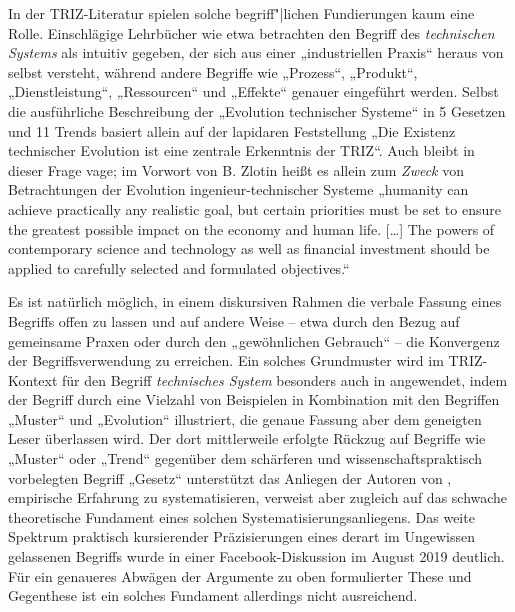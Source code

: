 \documentclass[11pt,a4paper]{article}
\begin{document}
In der TRIZ-Literatur spielen solche begriff"|lichen Fundierungen kaum eine
Rolle.  Einschlägige Lehrbücher wie etwa \cite{KS2017} betrachten den Begriff
des \emph{technischen Systems} als intuitiv gegeben, der sich aus einer
„industriellen Praxis“ heraus \cite[S. 2]{KS2017} von selbst versteht, während
andere Begriffe wie „Prozess“, „Produkt“, „Dienstleistung“, „Ressourcen“ und
„Effekte“ \cite[S. 6--10]{KS2017} genauer eingeführt werden. Selbst die
ausführliche Beschreibung der „Evolution technischer Systeme“ in 5 Gesetzen
und 11 Trends \cite[Kap. 4.8]{KS2017} basiert allein auf der lapidaren
Feststellung „Die Existenz technischer Evolution ist eine zentrale Erkenntnis
der TRIZ“.  Auch \cite{TESE2018} bleibt in dieser Frage vage; im Vorwort von
B. Zlotin heißt es allein zum \emph{Zweck} von Betrachtungen der Evolution
ingenieur-technischer Systeme „humanity can achieve practically any realistic
goal, but certain priorities must be set to ensure the greatest possible
impact on the economy and human life. [\ldots] The powers of contemporary
science and technology as well as financial investment should be applied to
carefully selected and formulated objectives.“

Es ist natürlich möglich, in einem diskursiven Rahmen die verbale Fassung
eines Begriffs offen zu lassen und auf andere Weise -- etwa durch den Bezug
auf gemeinsame Praxen oder durch den „gewöhnlichen Gebrauch“ -- die Konvergenz
der Begriffsverwendung zu erreichen.  Ein solches Grundmuster wird im
TRIZ-Kontext für den Begriff \emph{technisches System} besonders auch in
\cite{TESE2018} angewendet, indem der Begriff durch eine Vielzahl von
Beispielen in Kombination mit den Begriffen „Muster“ und „Evolution“
illustriert, die genaue Fassung aber dem geneigten Leser überlassen wird.  Der
dort mittlerweile erfolgte Rückzug auf Begriffe wie „Muster“ oder „Trend“
gegenüber dem schärferen und wissenschaftspraktisch vorbelegten Begriff
„Gesetz“ unterstützt das Anliegen der Autoren von \cite{TESE2018}, empirische
Erfahrung zu systematisieren, verweist aber zugleich auf das schwache
theoretische Fundament eines solchen Systematisierungsanliegens.  Das weite
Spektrum praktisch kursierender Präzisierungen eines derart im Ungewissen
gelassenen Begriffs wurde in einer Facebook-Diskussion \cite{Graebe2019b} im
August 2019 deutlich. Für ein genaueres Abwägen der Argumente zu oben
formulierter These und Gegenthese ist ein solches Fundament allerdings nicht
ausreichend.
\end{document}
